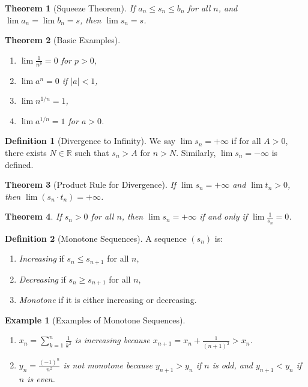 \documentclass[7pt]{article}
\theoremstyle{definition}
\newtheorem{definition}{Definition}
\theoremstyle{plain}
\newtheorem{theorem}{Theorem}
\newtheorem{example}{Example}
\begin{document}
\begin{theorem}[Squeeze Theorem]
If $ a_n \leq s_n \leq b_n $ for all $ n $, and $ \lim a_n = \lim b_n = s $, then $ \lim s_n = s $.
\end{theorem}

\begin{theorem}[Basic Examples]

\begin{enumerate}
    \item $ \lim \frac{1}{n^p} = 0 $ for $ p > 0 $,
    \item $ \lim a^n = 0 $ if $ |a| < 1 $,
    \item $ \lim n^{1/n} = 1 $,
    \item $ \lim a^{1/n} = 1 $ for $ a > 0 $.
\end{enumerate}
\end{theorem}

\begin{definition}[Divergence to Infinity]
We say $ \lim s_n = +\infty $ if for all $ A > 0 $, there exists $ N \in \mathbb{R} $ such that $ s_n > A $ for $ n > N $. Similarly, $ \lim s_n = -\infty $ is defined.
\end{definition}

\begin{theorem}[Product Rule for Divergence]
If $ \lim s_n = +\infty $ and $ \lim t_n > 0 $, then $ \lim (s_n \cdot t_n) = +\infty $.
\end{theorem}

\begin{theorem}
If $ s_n > 0 $ for all $ n $, then $ \lim s_n = +\infty $ if and only if $ \lim \frac{1}{s_n} = 0 $.
\end{theorem}

\begin{definition}[Monotone Sequences]
A sequence $ (s_n) $ is:
\begin{enumerate}
    \item \emph{Increasing} if $ s_n \leq s_{n+1} $ for all $ n $,
    \item \emph{Decreasing} if $ s_n \geq s_{n+1} $ for all $ n $,
    \item \emph{Monotone} if it is either increasing or decreasing.
\end{enumerate}
\end{definition}

\begin{example}[Examples of Monotone Sequences]

\begin{enumerate}
    \item $ x_n = \sum_{k=1}^n \frac{1}{k^2} $ is increasing because $ x_{n+1} = x_n + \frac{1}{(n+1)^2} > x_n $.
    \item $ y_n = \frac{(-1)^n}{n^2} $ is not monotone because $ y_{n+1} > y_n $ if $ n $ is odd, and $ y_{n+1} < y_n $ if $ n $ is even.
\end{enumerate}
\end{example}
\end{document}
